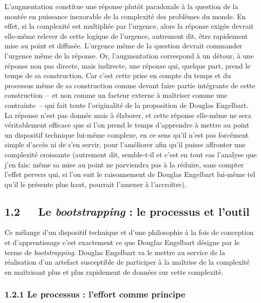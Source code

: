\documentclass{FramateX}
\begin{document}
\begin{refsection}
L'augmentation constitue une réponse plutôt paradoxale à la question de
la montée en puissance inexorable de la complexité des problèmes du
monde. En effet, si la complexité est multipliée par l'urgence, alors
la réponse exigée devrait elle-même relever de cette logique de
l'urgence, autrement dit, être rapidement mise au point et diffusée.
L'urgence même de la question devrait commander l'urgence même de la
réponse. Or, l'augmentation correspond à un détour, à une réponse non
pas directe, mais indirecte, une réponse qui, quelque part, prend le
temps de sa construction. Car c'est cette prise en compte du temps et
du processus même de sa construction comme devant faire partie
intégrante de cette construction --~et non comme un facteur externe à
maîtriser comme une contrainte~-- qui fait toute l'originalité de la
proposition de Douglas Engelbart. La réponse n'est pas donnée mais à
élaborer, et cette réponse elle-même ne sera véritablement efficace que
si l'on prend le temps d'apprendre à mettre au point un dispositif
technique lui-même complexe, en ce sens qu'il n'est pas forcément
simple d'accès ni de s'en servir, pour l'améliorer afin qu'il puisse
affronter une complexité croissante (autrement dit, semble-t-il et
c'est en tout cas l'analyse que j'en fais: même sa mise au point ne
parviendra pas à la réduire, sans compter l'effet pervers qui, si l'on
suit le raisonnement de Douglas Engelbart lui-même tel qu'il le
présente plus haut, pourrait l'amener à l'accroître).

\subsection*{1.2~~~Le \textit{bootstrapping} : le processus et l'outil}
{}

Ce mélange d'un dispositif technique et d'une philosophie à la fois de
conception et d'apprentissage c'est exactement ce que Douglas Engelbart
désigne par le terme de \textit{bootstrapping}. Douglas Engelbart va le mettre
au service de la réalisation d'un artefact susceptible de participer à
la maîtrise de la complexité en maîtrisant plus et plus rapidement de
données sur cette complexité.


\subsubsection*{1.2.1 Le processus : l'effort comme principe}
{}


\end{refsection}
\end{document}
